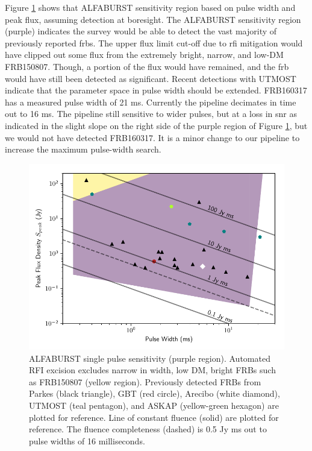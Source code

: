 \documentclass[a4paper,fleqn,usenatbib]{mnras}
\begin{document}
Figure \ref{fig:sensitivity_range} shows that ALFABURST sensitivity region based
on pulse width and peak flux, assuming detection at boresight. The ALFABURST
sensitivity region (purple) indicates the survey would be able to detect the
vast majority of previously reported \glspl{frb}. The upper flux limit cut-off
due to \gls{rfi} mitigation would have clipped out some flux from the extremely
bright, narrow, and low-DM FRB150807. Though, a portion of the flux would have
remained, and the \gls{frb} would have still been detected as significant.
Recent detections with UTMOST \citep{2017MNRAS.468.3746C,atel10697} indicate
that the parameter space in pulse width should be extended.  FRB160317 has a
measured pulse width of 21 ms. Currently the pipeline decimates in time out to
16 ms. The pipeline still sensitive to wider pulses, but at a loss in \gls{snr}
as indicated in the slight slope on the right side of the purple region of
Figure \ref{fig:sensitivity_range}, but we would not have detected FRB160317. It
is a minor change to our pipeline to increase the maximum pulse-width search.

\begin{figure}
    \includegraphics[width=1.0\linewidth]{figures/sensitivity_range.pdf}
    \caption{ALFABURST single pulse sensitivity (purple region). Automated RFI
    excision excludes narrow in width, low DM, bright FRBs such as FRB150807
    (yellow region).  Previously detected FRBs from Parkes (black triangle), GBT
    (red circle), Arecibo (white diamond), UTMOST (teal pentagon), and ASKAP
    (yellow-green hexagon) are plotted for reference. Line of constant fluence
    (solid) are plotted for reference. The fluence completeness (dashed) is 0.5
    Jy ms out to pulse widths of 16 milliseconds.
    }
    \label{fig:sensitivity_range}
\end{figure}
\end{document}
